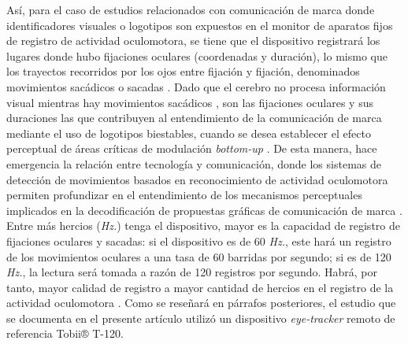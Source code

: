 \documentclass[spanish]{textolivre}
\begin{document}
Así, para el caso de estudios relacionados con comunicación de marca donde identificadores visuales o logotipos son expuestos en el monitor de aparatos fijos de registro de actividad oculomotora, se tiene que el dispositivo registrará los lugares donde hubo fijaciones oculares (coordenadas y duración), lo mismo que los trayectos recorridos por los ojos entre fijación y fijación, denominados movimientos sacádicos o sacadas \cite{ross_changes_2001}. Dado que el cerebro no procesa información visual mientras hay movimientos sacádicos \cite{rosa_what_2015}, son las fijaciones oculares y sus duraciones las que contribuyen al entendimiento de la comunicación de marca mediante el uso de logotipos biestables, cuando se desea establecer el efecto perceptual de áreas críticas de modulación \textit{bottom-up} \cite{rodriguez-martinez_can_2024}. De esta manera, hace emergencia la relación entre tecnología y comunicación, donde los sistemas de detección de movimientos basados en reconocimiento de actividad oculomotora permiten profundizar en el entendimiento de los mecanismos perceptuales implicados en la decodificación de propuestas gráficas de comunicación de marca \cite{azmy_eye_2023}. Entre más hercios (\textit{Hz.}) tenga el dispositivo, mayor es la capacidad de registro de fijaciones oculares y sacadas: si el dispositivo es de 60 \textit{Hz.}, este hará un registro de los movimientos oculares a una tasa de 60 barridas por segundo; si es de 120 \textit{Hz.}, la lectura será tomada a razón de 120 registros por segundo. Habrá, por tanto, mayor calidad de registro a mayor cantidad de hercios en el registro de la actividad oculomotora \cite{rosa_what_2015}. Como se reseñará en párrafos posteriores, el estudio que se documenta en el presente artículo utilizó un dispositivo \textit{eye-tracker} remoto de referencia Tobii® T-120. 
\end{document}
